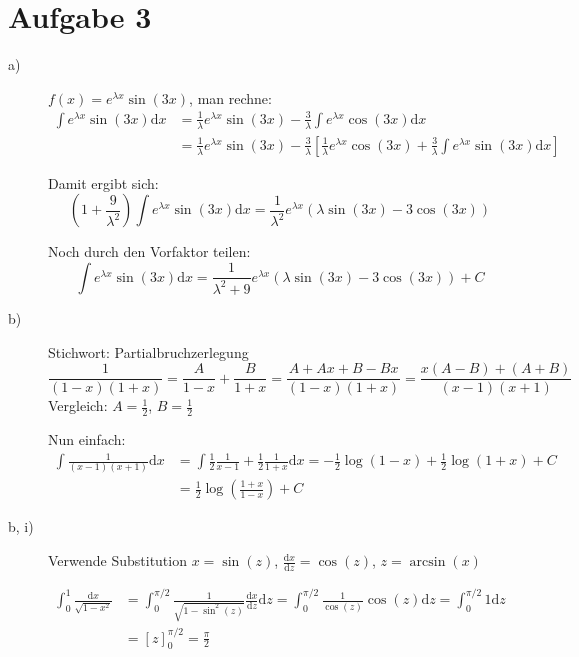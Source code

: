 \section*{Aufgabe 3}

\begin{description}
	\item[a)] $f(x) = e^{\lambda x} \sin(3x)$, man rechne:
	\begin{align*}
		\int e^{\lambda x} \sin(3x) \mathrm{d} x	
		&= \frac{1}{\lambda} e^{\lambda x} \sin(3x) - \frac{3}{\lambda} \int e^{\lambda x} \cos(3x) \mathrm{d} x \\
		&= \frac{1}{\lambda} e^{\lambda x} \sin(3x) - \frac{3}{\lambda} \left[ \frac{1}{\lambda} e^{\lambda x} \cos(3x) + \frac{3}{\lambda} \int e^{\lambda x} \sin(3x) \mathrm{d} x \right]
	\end{align*}
	
	Damit ergibt sich:
	\[
		\left( 1 + \frac{9}{\lambda^2} \right) \int e^{\lambda x} \sin(3x) \mathrm{d} x = \frac{1}{\lambda^2} e^{\lambda x} \left( \lambda \sin(3x) - 3 \cos(3x) \right)	
	\]
	
	Noch durch den Vorfaktor teilen:
	\[
		\int e^{\lambda x} \sin(3x) \mathrm{d} x 
		= \frac{1}{\lambda^2 + 9} e^{\lambda x} \left( \lambda \sin(3x) - 3 \cos(3x) \right) + C
	\]

	\item[b)] Stichwort: Partialbruchzerlegung
	\[ 
		\frac{1}{(1 - x)(1 + x)} 
		= \frac{A}{1 - x} + \frac{B}{1 + x} 
		= \frac{A + Ax + B - Bx}{(1 - x)(1 + x)} 
		= \frac{x(A - B) + (A + B)}{(x - 1)(x + 1)}
	\]
	Vergleich: $A = \frac{1}{2}$, $B = \frac{1}{2}$
	
	Nun einfach:
	\begin{align*}
		\int \frac{1}{(x - 1)(x + 1)} \mathrm{d} x 
		&= \int \frac{1}{2} \frac{1}{x - 1} + \frac{1}{2} \frac{1}{1 + x} \mathrm{d} x 
		= - \frac{1}{2} \log(1 - x) + \frac{1}{2} \log(1 + x) + C \\
		&= \frac{1}{2} \log \left( \frac{1 + x}{1 - x} \right) + C
	\end{align*}

	\item[b, i)] Verwende Substitution $x = \sin(z)$, $\frac{\mathrm{d} x}{\mathrm{d} z} = \cos(z)$, $z = \arcsin(x)$
	
	\begin{align*}
		\int_0^1 \frac{\mathrm{d} x}{\sqrt{1 - x^2}}	 
		&= \int^{\pi/2}_{0} \frac{1}{\sqrt{1 - \sin^2(z)}} \frac{\mathrm{d} x}{\mathrm{d} z} \mathrm{d} z
		= \int^{\pi / 2}_0 \frac{1}{\cos(z)} \cos(z) \mathrm{d} z
		= \int^{\pi / 2}_0 1 \mathrm{d} z \\
		&= \left[ z \right]^{\pi / 2}_0 = \frac{\pi}{2}
	\end{align*}


\end{description}
